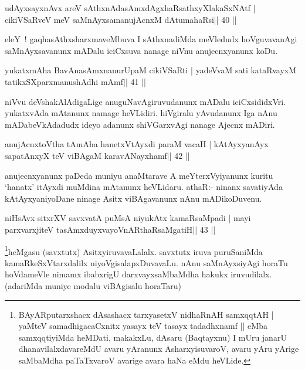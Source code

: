 \begin{shl}
udAyxsayxnAvx areV sAthxnAdasAmxdAgxhaRsathxyXlakaSxNAtf |
cikiVSaRveV meV saMnAyxsamanujAcnxM dAtumahaRsi\hfill || 40 ||
\end{shl}

\begin{artha}
eleY~! gaqhasAthxsharxmaveMbuva I sAthxnadiMda meVledudx hoVguvavanAgi saMnAyxsavanunx mADalu iciCxsuva nanage niVnu anujecnxyanunx koDu.
\end{artha}

\begin{shl}
yukatxmAha BavAnasAmxnanurUpaM cikiVSaRti |
yadeVvaM sati kataRvayxM tatikxSXparxmanushAdhi mAmf\hfill || 41 ||
\end{shl}

\begin{artha}
niVvu deVshakAlAdigaLige anuguNavAgiruvudanunx mADalu iciCxsididxVri. yukatxvAda mAtanunx namage heVLidiri. hiVgiralu yAvudanunx Iga nAnu mADabeVkAdadudx ideyo adanunx shiVGarxvAgi nanage Ajecnx mADiri.
\end{artha}


\begin{shl}
anujAcnxtoV\s tha tAmAha hanetxVtAyxdi paraM vacaH |
kAtAyxyanAyx sapatAnxyX teV viBAgaM karavANayxhamf\hfill || 42 ||
\end{shl}

\begin{artha}
anujecnxyanunx paDeda muniyu anaMtarave A meYterxVyiyanunx kuritu
`hanatx' itAyxdi muMdina mAtanunx heVLidaru. athaR:- ninanx savatiyAda
kAtAyxyaniyoDane ninage Asitx viBAgavanunx nAnu mADikoDuvenu.
\end{artha}


\begin{shl}
niHsAvx sitxrXV savxvatA puMsA niyukAtx kamaRsaMpadi |
mayi parxvarxjiteV tasAmxduyxvayoVnARthaRsaMgatiH\hfill || 43 ||
\end{shl}

\begin{artha}
\footnote{BAyARputarxshacx dAsashacx tarxyasetxV nidhaRnAH
 samxqqtAH | yaMteV samadhigacaCxnitx yasayx teV tasayx tadadhxnamf || eMba
 samxqqtiyiMda heMDati, makakxLu, dAsaru (Baqtayxnu) I mUru janarU
 dhanavilalxdavareMdU avaru yAranunx AsharxyisuvaroV, avaru yAru
 yArige saMbaMdha paTaTxvaroV avarige avara haNa eMdu heVLide.}heMgasu 
 (savxtutx) AsitxyiruvavaLalalx. savxtutx iruva
puruSaniMda kamaRkeSxVtarxdalilx niyoVgisalapxDuvavaLu. nAnu
saMnAyxsiyAgi horaTu hoVdameVle nimamx ibabxrigU darxvayxsaMbaMdha
hakukx iruvudilalx. (adariMda muniye modalu viBAgisalu horaTaru)
\end{artha}


